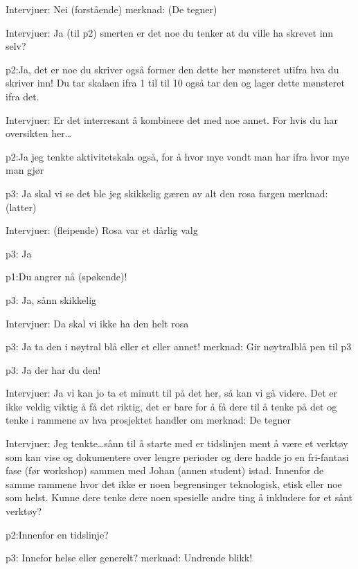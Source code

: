 \documentclass[11pt,UKenglish, a4paper]{article}
\begin{document}
\textcolor{myBlue} {Intervjuer:} Nei (forstående)
merknad: (De tegner)

\textcolor{myBlue} {Intervjuer:} Ja (til p2) smerten er det noe du tenker at du ville ha skrevet inn selv?

\textcolor{myYellow} {p2:}Ja, det er noe du skriver også former den dette her mønsteret utifra hva du skriver inn! Du tar skalaen ifra 1 til til 10 også tar den og lager dette mønsteret ifra det.

\textcolor{myBlue} {Intervjuer:} Er det interresant å kombinere det med noe annet. For hvis du har oversikten her\dots

\textcolor{myYellow} {p2:}Ja jeg tenkte aktivitetskala også, for å hvor mye vondt man har ifra hvor mye man gjør

\textcolor{myR} {p3:} Ja skal vi se det ble jeg skikkelig gæren av alt den rosa fargen
merknad: (latter)

\textcolor{myBlue} {Intervjuer:} (fleipende) Rosa var et dårlig valg

\textcolor{myR} {p3:} Ja

\textcolor{myGreen} {p1:}Du angrer nå (spøkende)!

\textcolor{myR} {p3:} Ja, sånn skikkelig

\textcolor{myBlue} {Intervjuer:} Da skal vi ikke ha den helt rosa

\textcolor{myR} {p3:} Ja ta den i nøytral blå eller et eller annet!
merknad: Gir nøytralblå pen til p3

\textcolor{myR} {p3:} Ja der har du den!

\textcolor{myBlue} {Intervjuer:} Ja vi kan jo ta et minutt til på det her, så kan vi gå videre. Det er ikke veldig viktig å få det riktig, det er bare for å få dere til å tenke på det og tenke i rammene av hva prosjektet handler om
merknad: De tegner

\textcolor{myBlue} {Intervjuer:} Jeg tenkte\dots sånn til å starte med er tidslinjen ment å være et verktøy som kan vise og dokumentere over lengre perioder og dere hadde jo en fri-fantasi fase (før workshop) sammen med Johan (annen student) istad. Innenfor de samme rammene hvor det ikke er noen begrensinger teknologisk, etisk eller noe som helst. Kunne dere tenke dere noen spesielle andre ting å inkludere for et sånt verktøy? 

\textcolor{myYellow} {p2:}Innenfor en tidslinje?

\textcolor{myR} {p3:} Innefor helse eller generelt?
merknad: Undrende blikk!
\end{document}
